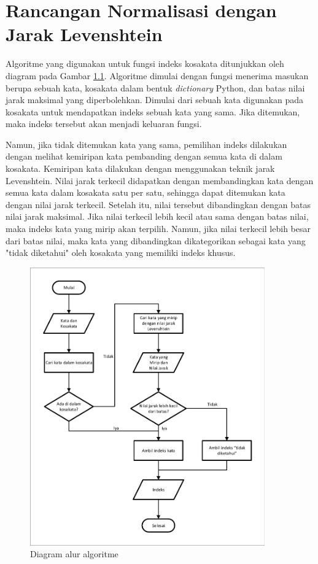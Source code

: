 \chapter{Rancangan Normalisasi dengan Jarak Levenshtein}

Algoritme yang digunakan untuk fungsi indeks kosakata ditunjukkan oleh diagram pada Gambar \ref{fig:ta_index}. Algoritme dimulai dengan fungsi menerima masukan berupa sebuah kata, kosakata dalam bentuk \textit{dictionary} Python, dan batas nilai jarak maksimal yang diperbolehkan. Dimulai dari sebuah kata digunakan pada kosakata untuk mendapatkan indeks sebuah kata yang sama. Jika ditemukan, maka indeks tersebut akan menjadi keluaran fungsi.

Namun, jika tidak ditemukan kata yang sama, pemilihan indeks dilakukan dengan melihat kemiripan kata pembanding dengan semua kata di dalam kosakata. Kemiripan kata dilakukan dengan menggunakan teknik jarak Levenshtein. Nilai jarak terkecil didapatkan dengan membandingkan kata dengan semua kata dalam kosakata satu per satu, sehingga dapat ditemukan kata dengan nilai jarak terkecil. Setelah itu, nilai tersebut dibandingkan dengan batas nilai jarak maksimal. Jika nilai terkecil lebih kecil atau sama dengan batas nilai, maka indeks kata yang mirip akan terpilih. Namun, jika nilai terkecil lebih besar dari batas nilai, maka kata yang dibandingkan dikategorikan sebagai kata yang "tidak diketahui" oleh kosakata yang memiliki indeks khusus.

\begin{figure}[H]
	\centering
	\includegraphics[width=0.9\textwidth, trim=2 2 2 2, clip]{resources/3/ta_index.pdf}
	\caption{Diagram alur algoritme}
	\label{fig:ta_index}
\end{figure}

